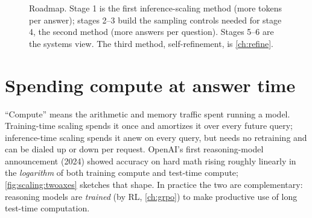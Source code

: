 \begin{figure}[t]
\centering
{}
\caption{Roadmap. Stage 1 is the first inference-scaling method (more tokens per answer); stages 2--3
build the sampling controls needed for stage 4, the second method (more answers per question).
Stages 5--6 are the systems view. The third method, self-refinement, is \cref{ch:refine}.}
\label{fig:scaling:roadmap}
\end{figure}

\section{Spending compute at answer time}\label{sec:scaling:intro}

``Compute'' means the arithmetic and memory traffic spent running a model. Training-time scaling
spends it once and amortizes it over every future query; inference-time scaling spends it anew on
every query, but needs no retraining and can be dialed up or down per request. OpenAI's first
reasoning-model announcement (2024) showed accuracy on hard math rising roughly linearly in the
\emph{logarithm} of both training compute and test-time compute; \cref{fig:scaling:twoaxes} sketches
that shape. In practice the two are complementary: reasoning models are \emph{trained} (by RL,
\cref{ch:grpo}) to make productive use of long test-time computation.

